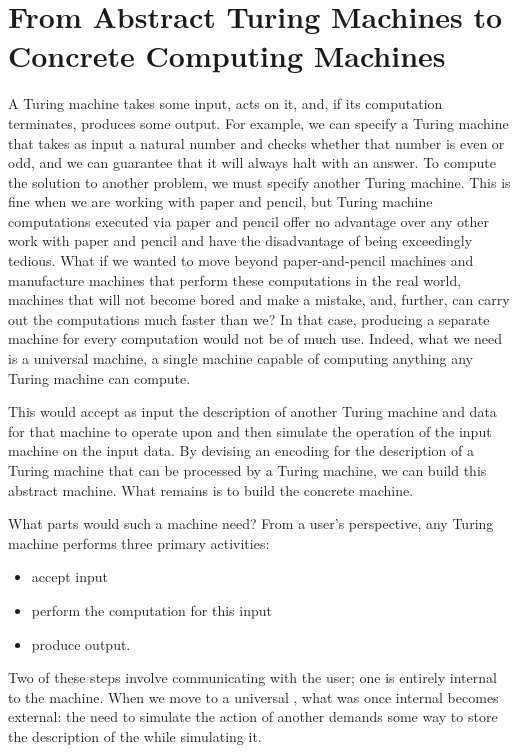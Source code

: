 \label{background:computers}
\section{From Abstract Turing Machines to Concrete Computing Machines}
A Turing machine takes some input, acts on it, and, if its computation terminates, produces some output. For example, we can specify a Turing machine that takes as input a natural number and checks whether that number is even or odd, and we can guarantee that it will always halt with an answer. To compute the solution to another problem, we must specify another Turing machine. This is fine when we are working with paper and pencil, but Turing machine computations executed via paper and pencil offer no advantage over any other work with paper and pencil and have the disadvantage of being exceedingly tedious. What if we wanted to move beyond paper-and-pencil machines and manufacture machines that perform these computations in the real world, machines that will not become bored and make a mistake, and, further, can carry out the computations much faster than we? In that case, producing a separate machine for every computation would not be of much use. Indeed, what we need is a universal machine, a single machine capable of computing anything any Turing machine can compute.

This  would accept as input the description of another Turing machine and data for that machine to operate upon and then simulate the operation of the input machine on the input data. By devising an encoding for the description of a Turing machine that can be processed by a Turing machine, we can build this abstract machine. What remains is to build the concrete machine.

What parts would such a machine need? From a user's perspective, any Turing machine performs three primary activities:
\begin{itemize}
\item accept input
\item perform the computation for this input
\item produce output.
\end{itemize}
Two of these steps involve communicating with the user; one is entirely internal to the machine. When we move to a universal \TM, what was once internal becomes external: the need to simulate the action of another \TM demands some way to store the description of the \TM while simulating it.

